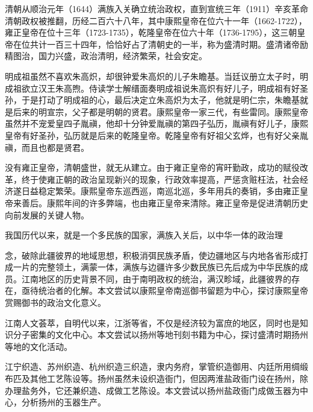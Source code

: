 
清朝从顺治元年（1644）满族入关确立统治政权，直到宣统三年（1911）辛亥革命清朝政权被推翻，历经二百六十八年，其中康熙皇帝在位六十一年（1662-1722），雍正皇帝在位十三年（1723-1735），乾隆皇帝在位六十年（1736-1795），这三朝皇帝在位共计一百三十四年，恰恰好占了清朝史的一半，称为盛清时期。盛清诸帝励精图治，国力兴盛，政治清明，经济繁荣，社会安定。

明成祖虽然不喜欢朱高炽，却很钟爱朱高炽的儿子朱瞻基。当廷议册立太子时，明成祖欲立汉王朱高煦。侍读学士解缙面奏明成祖说朱高炽有好儿子，明成祖有好圣孙，于是打动了明成祖的心，最后决定立朱高炽为太子，他就是明仁宗，朱瞻基就是后来的明宣宗，父子都是明朝的贤君。康熙皇帝一家三代，有些雷同。康熙皇帝虽然并不宠爱皇四子胤禛，他却十分钟爱胤禛的第四子弘历，胤禛有好儿子，康熙皇帝有好圣孙，弘历就是后来的乾隆皇帝。乾隆皇帝有好祖父玄烨，也有好父亲胤禛，而且也都是贤君。

没有雍正皇帝，清朝盛世，就无从建立。由于雍正皇帝的宵旰勤政，成功的赋役改革，终于使雍正朝的政治呈现新兴的现象，行政效率提高，严惩贪赃枉法，社会经济遂日益稳定繁荣。康熙皇帝东巡西巡，南巡北巡，多年用兵的奏销，多由雍正皇帝来善后。康熙年间的许多弊端，也由雍正皇帝来清除。雍正皇帝是促进清朝历史向前发展的关键人物。

我国历代以来，就是一个多民族的国家，满族入关后，以中华一体的政治理

\vfill
\begin{BookNotes}
\end{BookNotes}

\noindent 念，破除此疆彼界的地域思想，积极消弭民族矛盾，使边疆地区与内地各省形成打成一片的完整领土，满蒙一体，满族与边疆许多少数民族已先后成为中华民族的成员。江南地区的历史背景不同，由于南明政权的统治，满汉畛域，此疆彼界的存在，亟待统治者的化解。本文尝试以康熙皇帝南巡御书留题为中心，探讨康熙皇帝赏赐御书的政治文化意义。

江南人文荟萃，自明代以来，江浙等省，不仅是经济较为富庶的地区，同时也是知识分子密集的文化中心。本文尝试以扬州等地刊刻书籍为中心，探讨盛清时期扬州等地的文化活动。

江宁织造、苏州织造、杭州织造三织造，隶内务府，掌管织造御用、内廷所用绸缎布匹及其他工艺陈设等。扬州虽然未设织造衙门，但因两淮盐政衙门设在扬州，除办理盐务外，它还兼织造、成做工艺陈设。本文尝试以扬州盐政衙门成做玉器为中心，分析扬州的玉器生产。

